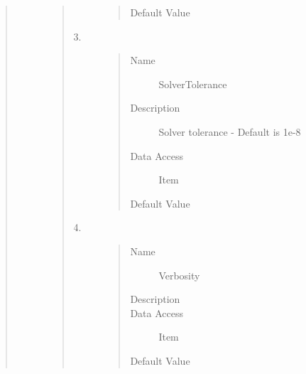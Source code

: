 \documentclass[letterpaper,10pt,english]{sphinxmanual}
\begin{document}
\begin{quote}
\begin{description}
\begin{quote}
\begin{description}
\begin{quote}
\begin{description}
\item[{Default Value}] \leavevmode
{}

\end{description}\end{quote}

\item[{3.}] \leavevmode\begin{quote}\begin{description}
\item[{Name}] \leavevmode
SolverTolerance

\item[{Description}] \leavevmode
Solver tolerance - Default is 1e-8

\item[{Data Access}] \leavevmode
Item

\item[{Default Value}] \leavevmode
{}

\end{description}\end{quote}

\item[{4.}] \leavevmode\begin{quote}\begin{description}
\item[{Name}] \leavevmode
Verbosity

\item[{Description}] \leavevmode
{}

\item[{Data Access}] \leavevmode
Item

\item[{Default Value}] \leavevmode
{}


\end{description}
\end{quote}
\end{description}
\end{quote}
\end{description}
\end{quote}
\end{document}
